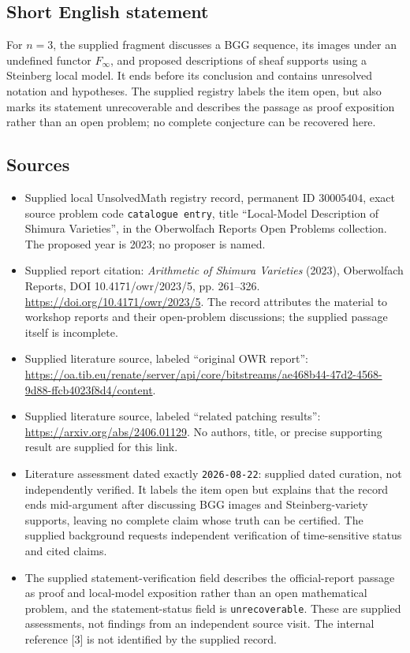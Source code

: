 \documentclass[11pt]{article}
\begin{document}
\subsection{Short English statement}
For \(n=3\), the supplied fragment discusses a BGG sequence, its images under an undefined functor \(F_\infty\), and proposed descriptions of sheaf supports using a Steinberg local model. It ends before its conclusion and contains unresolved notation and hypotheses. The supplied registry labels the item open, but also marks its statement unrecoverable and describes the passage as proof exposition rather than an open problem; no complete conjecture can be recovered here.
\subsection{Sources}
\begin{itemize}
\item Supplied local UnsolvedMath registry record, permanent ID \(30005404\), exact source problem code \texttt{catalogue entry}, title ``Local-Model Description of Shimura Varieties'', in the Oberwolfach Reports Open Problems collection. The proposed year is 2023; no proposer is named.
\item Supplied report citation: \emph{Arithmetic of Shimura Varieties} (2023), Oberwolfach Reports, DOI 10.4171/owr/2023/5, pp. 261--326. \url{https://doi.org/10.4171/owr/2023/5}. The record attributes the material to workshop reports and their open-problem discussions; the supplied passage itself is incomplete.
\item Supplied literature source, labeled ``original OWR report'': \url{https://oa.tib.eu/renate/server/api/core/bitstreams/ae468b44-47d2-4568-9d88-ffcb4023f8d4/content}.
\item Supplied literature source, labeled ``related patching results'': \url{https://arxiv.org/abs/2406.01129}. No authors, title, or precise supporting result are supplied for this link.
\item Literature assessment dated exactly \texttt{2026-08-22}: supplied dated curation, not independently verified. It labels the item open but explains that the record ends mid-argument after discussing BGG images and Steinberg-variety supports, leaving no complete claim whose truth can be certified. The supplied background requests independent verification of time-sensitive status and cited claims.
\item The supplied statement-verification field describes the official-report passage as proof and local-model exposition rather than an open mathematical problem, and the statement-status field is \texttt{unrecoverable}. These are supplied assessments, not findings from an independent source visit. The internal reference [3] is not identified by the supplied record.
\end{itemize}
\end{document}
